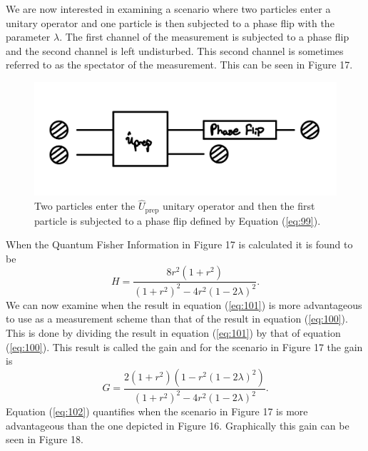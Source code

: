 \documentclass[twocolumn]{article}
\begin{document}
We are now interested in examining a scenario where two particles enter a unitary operator and one particle is then subjected to a phase flip with the parameter $\lambda$. The first channel of the measurement is subjected to a phase flip and the second channel is left undisturbed. This second channel is sometimes referred to as the spectator of the measurement. This can be seen in Figure 17.
\newpage
\begin{figure}[h]
\begin{center}
\includegraphics[width=0.65\linewidth]{Two-Particle-Phase-Flip-Single-Channel-Lambda-Schematic.jpg}
\caption{Two particles enter the $\hat{U}_{\text{prep}}$ unitary operator and then the first particle is subjected to a phase flip defined by Equation (\ref{eq:99}).}
\end{center}
\end{figure}
When the Quantum Fisher Information in Figure 17 is calculated it is found to be
\begin{equation}\label{eq:101}
H=\frac{8r^2(1+r^2)}{(1+r^2)^2-4r^2(1-2\lambda)^2}.
\end{equation}
We can now examine when the result in equation (\ref{eq:101}) is more advantageous to use as a measurement scheme than that of the result in equation (\ref{eq:100}). This is done by dividing the result in equation (\ref{eq:101}) by that of equation (\ref{eq:100}). This result is called the gain and for the scenario in Figure 17 the gain is
\begin{equation}\label{eq:102}
G=\frac{2(1+r^2)(1-r^2(1-2\lambda)^2)}{(1+r^2)^2-4r^2(1-2\lambda)^2}.
\end{equation}
Equation (\ref{eq:102}) quantifies when the scenario in Figure 17 is more advantageous than the one depicted in Figure 16. Graphically this gain can be seen in Figure 18.
\end{document}
